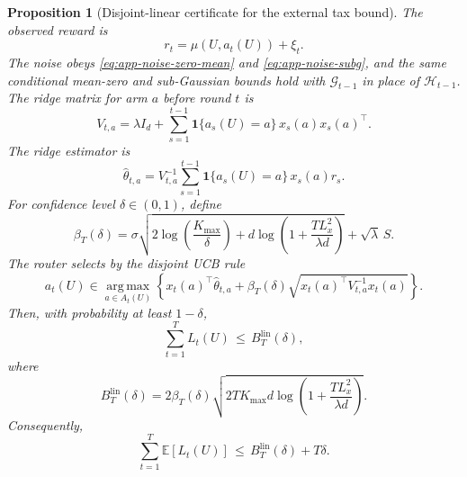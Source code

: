 \documentclass{article} %
\newtheorem{proposition}[theorem]{Proposition}
\begin{document}
\begin{proposition}[Disjoint-linear certificate for the external tax bound]
The observed reward is
\begin{equation}
\label{eq:app-lin-observed}
r_t
=
\mu(U,a_t(U))+\xi_t.
\end{equation}
The noise obeys \eqref{eq:app-noise-zero-mean} and
\eqref{eq:app-noise-subg}, and the same conditional mean-zero and
sub-Gaussian bounds hold with \(\mathcal G_{t-1}\) in place of
\(\mathcal H_{t-1}\). The ridge matrix for arm \(a\) before round \(t\) is
\begin{equation}
\label{eq:app-ridge-matrix}
V_{t,a}
=
\lambda I_d
+
\sum_{s=1}^{t-1}
\mathbf{1}\{a_s(U)=a\}\,x_s(a)x_s(a)^\top.
\end{equation}
The ridge estimator is
\begin{equation}
\label{eq:app-ridge-estimator}
\widehat{\theta}_{t,a}
=
V_{t,a}^{-1}
\sum_{s=1}^{t-1}
\mathbf{1}\{a_s(U)=a\}\,x_s(a)r_s.
\end{equation}
For confidence level \(\delta\in(0,1)\), define
\begin{equation}
\label{eq:app-beta}
\beta_T(\delta)
=
\sigma
\sqrt{
2\log\!\left(\frac{K_{\max}}{\delta}\right)
+
d\log\!\left(1+\frac{T L_x^2}{\lambda d}\right)
}
+
\sqrt{\lambda}\,S.
\end{equation}
The router selects by the disjoint UCB rule
\begin{equation}
\label{eq:app-ucb-rule}
a_t(U)
\in
\operatorname*{arg\,max}_{a\in A_t(U)}
\left\{
x_t(a)^\top\widehat{\theta}_{t,a}
+
\beta_T(\delta)
\sqrt{x_t(a)^\top V_{t,a}^{-1}x_t(a)}
\right\}.
\end{equation}
Then, with probability at least \(1-\delta\),
\begin{equation}
\label{eq:app-lin-highprob-tax}
\sum_{t=1}^{T}L_t(U)
\,\le\,
B_T^{\mathrm{lin}}(\delta),
\end{equation}
where
\begin{equation}
\label{eq:app-lin-bt}
B_T^{\mathrm{lin}}(\delta)
=
2\beta_T(\delta)
\sqrt{
2T K_{\max} d
\log\!\left(1+\frac{T L_x^2}{\lambda d}\right)
}.
\end{equation}
Consequently,
\begin{equation}
\label{eq:app-lin-expected-tax}
\sum_{t=1}^{T}\mathbb{E}[L_t(U)]
\,\le\,
B_T^{\mathrm{lin}}(\delta)+T\delta.
\end{equation}
\end{proposition}
\end{document}
